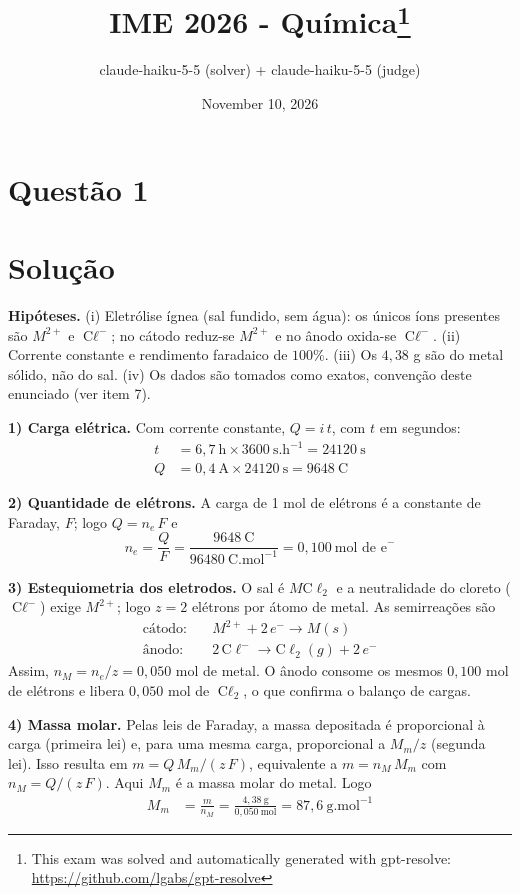 \documentclass{article}%
\title{IME 2026 - Química\thanks{This exam was solved and automatically generated with gpt-resolve: \url{https://github.com/lgabs/gpt-resolve}}}%
\author{claude{-}haiku{-}5{-}5 (solver) + claude{-}haiku{-}5{-}5 (judge)}%
\date{November 10, 2026}%
\begin{document}
%
\normalsize%
\maketitle%
\section*{Questão 1}

\section*{Solução}

\textbf{Hipóteses.} (i) Eletrólise ígnea (sal fundido, sem água): os únicos íons presentes são $M^{2+}$ e $\text{C}\ell^-$; no cátodo reduz-se $M^{2+}$ e no ânodo oxida-se $\text{C}\ell^-$. (ii) Corrente constante e rendimento faradaico de $100\%$. (iii) Os $4{,}38$ g são do metal sólido, não do sal. (iv) Os dados são tomados como exatos, convenção deste enunciado (ver item 7).

\textbf{1) Carga elétrica.} Com corrente constante, $Q = i\,t$, com $t$ em segundos:
\begin{align*}
t &= 6{,}7\ \text{h} \times 3600\ \text{s.h}^{-1} = 24120\ \text{s}\\
Q &= 0{,}4\ \text{A} \times 24120\ \text{s} = 9648\ \text{C}
\end{align*}

\textbf{2) Quantidade de elétrons.} A carga de 1 mol de elétrons é a constante de Faraday, $F$; logo $Q = n_{e}\,F$ e
\[
n_{e} = \frac{Q}{F} = \frac{9648\ \text{C}}{96480\ \text{C.mol}^{-1}} = 0{,}100\ \text{mol de e}^-
\]

\textbf{3) Estequiometria dos eletrodos.} O sal é $M\text{C}\ell_2$ e a neutralidade do cloreto ($\text{C}\ell^-$) exige $M^{2+}$; logo $z = 2$ elétrons por átomo de metal. As semirreações são
\begin{align*}
\text{cátodo:}\quad & M^{2+} + 2\,e^- \longrightarrow M(s)\\
\text{ânodo:}\quad & 2\,\text{C}\ell^- \longrightarrow \text{C}\ell_2(g) + 2\,e^-
\end{align*}
Assim, $n_M = n_e/z = 0{,}050$ mol de metal. O ânodo consome os mesmos $0{,}100$ mol de elétrons e libera $0{,}050$ mol de $\text{C}\ell_2$, o que confirma o balanço de cargas.

\textbf{4) Massa molar.} Pelas leis de Faraday, a massa depositada é proporcional à carga (primeira lei) e, para uma mesma carga, proporcional a $M_m/z$ (segunda lei). Isso resulta em $m = Q\,M_m/(z\,F)$, equivalente a $m = n_M\,M_m$ com $n_M = Q/(z\,F)$. Aqui $M_m$ é a massa molar do metal. Logo
\begin{align*}
M_m &= \frac{m}{n_M} = \frac{4{,}38\ \text{g}}{0{,}050\ \text{mol}} = 87{,}6\ \text{g.mol}^{-1}
\end{align*}
\end{document}
